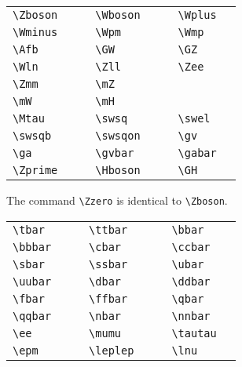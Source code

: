 \documentclass[11pt,a4paper]{cepcnote}
\begin{document}
\medskip

\begin{tabular}{llcllcll}
  \verb+\Zboson+ & \Zboson{} & \hspace{5mm} &
  \verb+\Wboson+ & \Wboson{} & \hspace{5mm} &
  \verb+\Wplus+ & \Wplus{} \\
  \verb+\Wminus+ & \Wminus{} & &
  \verb+\Wpm+ & \Wpm{} & &
  \verb+\Wmp+ & \Wmp{} \\
  \verb+\Afb+ & \Afb{} & &
  \verb+\GW+ & \GW{} & &
  \verb+\GZ+ & \GZ{} \\
  \verb+\Wln+ & \Wln{} & &
  \verb+\Zll+ & \Zll{} & &
  \verb+\Zee+ & \Zee{} \\
  \verb+\Zmm+ & \Zmm{} & &
  \verb+\mZ+ & \mZ{} \\
  \verb+\mW+ & \mW{} & &
  \verb+\mH+ & \mH{} \\
  \verb+\Mtau+ & \Mtau{} & &
  \verb+\swsq+ & \swsq{} & &
  \verb+\swel+ & \swel{} \\
  \verb+\swsqb+ &  \swsqb{} & &
  \verb+\swsqon+ & \swsqon{} & &
  \verb+\gv+ &  \gv{} \\
  \verb+\ga+ & \ga{} & &
  \verb+\gvbar+ & \gvbar{} & &
  \verb+\gabar+ & \gabar{} \\
  \verb+\Zprime+ & \Zprime{} & &
  \verb+\Hboson+ & \Hboson{} & &
  \verb+\GH+ & \GH{} \\
\end{tabular}

\medskip

\noindent The command \verb+\Zzero+ is identical to \verb+\Zboson+.

\medskip

\begin{tabular}{llcllcll}
  \verb+\tbar+ & \tbar{} & \hspace{1cm} &
  \verb+\ttbar+ & \ttbar{} & \hspace{1cm} &
  \verb+\bbar+ & \bbar{} \\
  \verb+\bbbar+ & \bbbar{} & &
  \verb+\cbar+ & \cbar{} & &
  \verb+\ccbar+ & \ccbar{} \\
  \verb+\sbar+ & \sbar{} & &
  \verb+\ssbar+ &  \ssbar{} & &
  \verb+\ubar+ & \ubar{} \\
  \verb+\uubar+ & \uubar{} & &
  \verb+\dbar+ & \dbar{} & &
  \verb+\ddbar+ & \ddbar{} \\
  \verb+\fbar+ & \fbar{} & &
  \verb+\ffbar+ &  \ffbar{} & &
  \verb+\qbar+ & \qbar{} \\
  \verb+\qqbar+ & \qqbar{} & &
  \verb+\nbar+ & \nbar{} & &
  \verb+\nnbar+ & \nnbar{} \\
  \verb+\ee+ & \ee{} & &
  \verb+\mumu+ & \mumu{} & &
  \verb+\tautau+ & \tautau{} \\
  \verb+\epm+ & \epm{} & &
  \verb+\leplep+ & \leplep{} & &
  \verb+\lnu+ & \lnu{} \\
\end{tabular}
\end{document}
